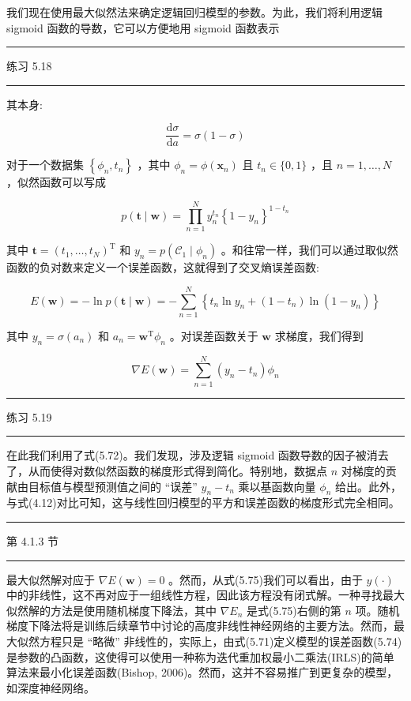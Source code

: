 \documentclass[10pt]{article}
\newcommand{\HRule}{\begin{center}\rule{0.9\linewidth}{0.2mm}\end{center}}
\begin{document}
我们现在使用最大似然法来确定逻辑回归模型的参数。为此，我们将利用逻辑 sigmoid 函数的导数，它可以方便地用 sigmoid 函数表示

\HRule

练习 5.18

\HRule

其本身:

\[
\frac{\mathrm{d}\sigma }{\mathrm{d}a} = \sigma \left( {1 - \sigma }\right)  \tag{5.72}
\]

对于一个数据集 \(\left\{  {{\phi }_{n},{t}_{n}}\right\}\) ，其中 \({\phi }_{n} = \phi \left( {\mathbf{x}}_{n}\right)\) 且 \({t}_{n} \in  \{ 0,1\}\) ，且 \(n = 1,\ldots ,N\) ，似然函数可以写成

\[
p\left( {\mathbf{t} \mid  \mathbf{w}}\right)  = \mathop{\prod }\limits_{{n = 1}}^{N}{y}_{n}^{{t}_{n}}{\left\{  1 - {y}_{n}\right\}  }^{1 - {t}_{n}} \tag{5.73}
\]

其中 \(\mathbf{t} = {\left( {t}_{1},\ldots ,{t}_{N}\right) }^{\mathrm{T}}\) 和 \({y}_{n} = p\left( {{\mathcal{C}}_{1} \mid  {\phi }_{n}}\right)\) 。和往常一样，我们可以通过取似然函数的负对数来定义一个误差函数，这就得到了交叉熵误差函数:

\[
E\left( \mathbf{w}\right)  =  - \ln p\left( {\mathbf{t} \mid  \mathbf{w}}\right)  =  - \mathop{\sum }\limits_{{n = 1}}^{N}\left\{  {{t}_{n}\ln {y}_{n} + \left( {1 - {t}_{n}}\right) \ln \left( {1 - {y}_{n}}\right) }\right\}   \tag{5.74}
\]

其中 \({y}_{n} = \sigma \left( {a}_{n}\right)\) 和 \({a}_{n} = {\mathbf{w}}^{\mathrm{T}}{\phi }_{n}\) 。对误差函数关于 \(\mathbf{w}\) 求梯度，我们得到

\[
\nabla E\left( \mathbf{w}\right)  = \mathop{\sum }\limits_{{n = 1}}^{N}\left( {{y}_{n} - {t}_{n}}\right) {\phi }_{n} \tag{5.75}
\]

\HRule

练习 5.19

\HRule

在此我们利用了式(5.72)。我们发现，涉及逻辑 sigmoid 函数导数的因子被消去了，从而使得对数似然函数的梯度形式得到简化。特别地，数据点 \(n\) 对梯度的贡献由目标值与模型预测值之间的 “误差” \({y}_{n} - {t}_{n}\) 乘以基函数向量 \({\phi }_{n}\) 给出。此外，与式(4.12)对比可知，这与线性回归模型的平方和误差函数的梯度形式完全相同。

\HRule

第 4.1.3 节

\HRule

最大似然解对应于 \(\nabla E\left( \mathbf{w}\right)  = 0\) 。然而，从式(5.75)我们可以看出，由于 \(y\left( \cdot \right)\) 中的非线性，这不再对应于一组线性方程，因此该方程没有闭式解。一种寻找最大似然解的方法是使用随机梯度下降法，其中 \(\nabla {E}_{n}\) 是式(5.75)右侧的第 \(n\) 项。随机梯度下降法将是训练后续章节中讨论的高度非线性神经网络的主要方法。然而，最大似然方程只是 “略微” 非线性的，实际上，由式(5.71)定义模型的误差函数(5.74)是参数的凸函数，这使得可以使用一种称为迭代重加权最小二乘法(IRLS)的简单算法来最小化误差函数(Bishop, 2006)。然而，这并不容易推广到更复杂的模型，如深度神经网络。
\end{document}
